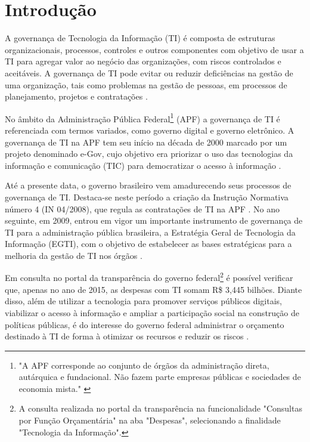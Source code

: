 \setcounter{page}{15}
\chapter{Introdução}
A governança de Tecnologia da Informação (TI) é composta de estruturas organizacionais, processos, controles e outros componentes com objetivo de usar a TI para agregar valor ao negócio das organizações, com riscos controlados e aceitáveis. A governança de TI pode evitar ou reduzir deficiências na gestão de uma organização, tais como problemas na gestão de pessoas, em processos de planejamento, projetos e contratações \cite{weill:04,tcu:14}.

No âmbito da Administração Pública Federal\footnote{"A APF corresponde ao conjunto de órgãos da administração direta, autárquica e fundacional. Não fazem parte empresas públicas e
sociedades de economia mista." \cite{egd:16}} (APF) a governança de TI é referenciada com termos variados, como governo digital e governo eletrônico. A governança de TI na APF tem seu início na década de 2000 marcado por um projeto denominado e-Gov, cujo objetivo era priorizar o uso das tecnologias da informação e comunicação (TIC) para democratizar o acesso à informação \cite{egd:16}.

Até a presente data, o governo brasileiro vem amadurecendo seus processos de governança de TI. Destaca-se neste período a criação da Instrução Normativa número 4 (IN 04/2008), que regula as contratações de TI na APF \cite{in04:08}. No ano seguinte, em 2009, entrou em vigor um importante instrumento de governança de TI para a administração pública brasileira, a Estratégia Geral de Tecnologia da Informação (EGTI), com o objetivo de estabelecer as bases estratégicas para a melhoria da gestão de TI nos órgãos \cite{egti:08}.

Em consulta no portal da transparência do governo federal\footnote{A consulta realizada no portal da transparência na funcionalidade "Consultas por Função Orçamentária" na aba "Despesas", selecionando a finalidade "Tecnologia da Informação".} é possível verificar que, apenas no ano de 2015, as despesas com TI somam R\$ 3,445 bilhões. Diante disso, além de utilizar a tecnologia para promover serviços públicos digitais, viabilizar o acesso à informação e ampliar a participação social na construção de políticas públicas, é do interesse do governo federal administrar o orçamento destinado à TI de forma à otimizar os recursos e reduzir os riscos \cite{egd:16}.

